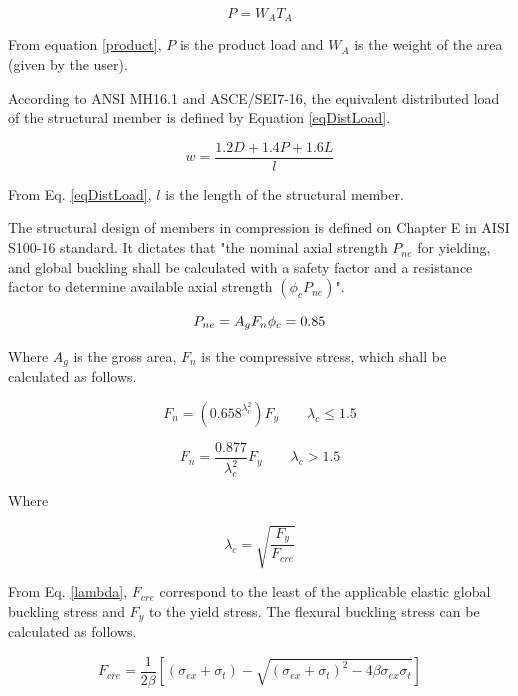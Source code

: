 \documentclass[twocolumn,10pt]{asme2e}
\begin{document}
\begin{equation}
P = W_A T_A
\label{product}
\end{equation}

From equation \ref{product}, $P$ is the product load and $W_A$ is the weight of the area (given by the user).

According to ANSI MH16.1 and ASCE/SEI7-16, the equivalent distributed load of the structural member is defined by Equation \ref{eqDistLoad}.

\begin{equation}
w = \frac{1.2 D + 1.4 P + 1.6 L}{l}
\label{eqDistLoad}
\end{equation}

From Eq. \ref{eqDistLoad}, $l$ is the length of the structural member. 

The structural design of members in compression is defined on Chapter E in AISI S100-16 standard. It dictates that "the nominal axial strength $P_{ne}$ for yielding, and global buckling shall be calculated with a safety factor and a resistance factor to determine available axial strength $\left( \phi _c P_{ne} \right)$".

\begin{equation}
	P_{ne} = A_g F_n \\
	\phi _c = 0.85
\end{equation}

Where $A_g$ is the gross area, $F_n$ is the compressive stress, which shall be calculated as follows.

\begin{equation}
	F_n = \left( 0.658 ^{\lambda _c ^2} \right) F_y \quad \quad \lambda _c \leq 1.5
\end{equation}

\begin{equation}
	F_n = \frac{0.877}{\lambda _c ^2}  F_y  \quad \quad \lambda _c > 1.5
\end{equation}

Where 

\begin{equation}
	\lambda _c = \sqrt{\frac{F_y}{F_{cre}}}
	\label{lambda}
\end{equation}

From Eq. \ref{lambda}, $F_{cre}$ correspond to the least of the applicable elastic global buckling stress and $F_y$ to the yield stress. The flexural buckling stress can be calculated as follows.

\begin{equation}
	F_{cre} = \frac{1}{2 \beta} \left[(\sigma _{ex} + \sigma _t ) - \sqrt{(\sigma _{ex} + \sigma _t)^2 - 4 \beta \sigma _{ex} \sigma _t} \right]
\end{equation}
\end{document}
